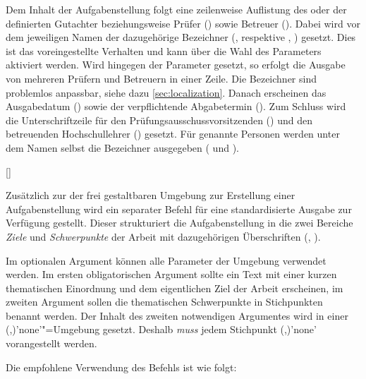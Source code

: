 \begin{DeclareEntity}{}
\begin{Declaration}
\begin{Declaration}
\begin{Declaration}
Dem Inhalt der Aufgabenstellung folgt eine zeilenweise Auflistung des oder der 
definierten Gutachter beziehungsweise Prüfer () sowie Betreuer 
(). Dabei wird vor dem jeweiligen Namen der dazugehörige 
Bezeichner (,  respektive 
, ) gesetzt. 
Dies ist das voreingestellte Verhalten und kann über die Wahl des Parameters
 aktiviert werden. Wird hingegen 
der Parameter  gesetzt, so 
erfolgt die Ausgabe von mehreren Prüfern und Betreuern in einer Zeile. Die 
Bezeichner sind problemlos anpassbar, siehe dazu \autoref{sec:localization}.
Danach erscheinen das Ausgabedatum () sowie der verpflichtende 
Abgabetermin (). Zum Schluss wird die Unterschriftzeile für den 
Prüfungsausschussvorsitzenden () und den betreuenden 
Hochschullehrer () gesetzt. Für genannte Personen werden unter 
dem Namen selbst die Bezeichner ausgegeben ( und 
).
\end{Declaration}
\end{Declaration}
\end{Declaration}

\begin{Declaration}
  {[\OList{}]}
\printdeclarationlist

Zusätzlich zur der frei gestaltbaren Umgebung  zur Erstellung
einer Aufgabenstellung wird ein separater Befehl für eine standardisierte 
Ausgabe zur Verfügung gestellt. Dieser strukturiert die Aufgabenstellung in die 
zwei Bereiche \emph{Ziele} und \emph{Schwerpunkte} der Arbeit mit dazugehörigen 
Überschriften (, ).

Im optionalen Argument können alle Parameter der Umgebung  
verwendet werden. Im ersten obligatorischen Argument sollte ein Text mit einer 
kurzen thematischen Einordnung und dem eigentlichen Ziel der Arbeit erscheinen, 
im zweiten Argument sollen die thematischen Schwerpunkte in Stichpunkten 
benannt werden. Der Inhalt des zweiten notwendigen Argumentes wird in einer 
(,)'none'"=Umgebung
gesetzt. Deshalb \emph{muss} jedem Stichpunkt 
(,)'none' vorangestellt 
werden.
\end{Declaration}
%
\begin{Example}
Die empfohlene Verwendung des Befehls  ist wie folgt:
\begin{Code}
\end{Code}
\end{Example}
\end{DeclareEntity}
